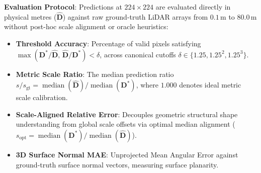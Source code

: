 \noindent\textbf{Evaluation Protocol}: Predictions at $224 \times 224$ are evaluated directly in physical metres ($\hat{\mathbf{D}}$) against raw ground-truth LiDAR arrays from $0.1$\,m to $80.0$\,m without post-hoc scale alignment or oracle heuristics:
\begin{itemize}
    \item \textbf{Threshold Accuracy}: Percentage of valid pixels satisfying $\max(\mathbf{D}^* / \hat{\mathbf{D}},\, \hat{\mathbf{D}} / \mathbf{D}^*) < \delta$, across canonical cutoffs $\delta \in \{1.25, 1.25^2, 1.25^3\}$.
    \item \textbf{Metric Scale Ratio}: The median prediction ratio $s / s_{\text{gt}} = \operatorname{median}(\hat{\mathbf{D}}) / \operatorname{median}(\mathbf{D}^*)$, where $1.000$ denotes ideal metric scale calibration.
    \item \textbf{Scale-Aligned Relative Error}: Decouples geometric structural shape understanding from global scale offsets via optimal median alignment ($s_{\text{opt}} = \operatorname{median}(\mathbf{D}^*) / \operatorname{median}(\hat{\mathbf{D}})$).
    \item \textbf{3D Surface Normal MAE}: Unprojected Mean Angular Error against ground-truth surface normal vectors, measuring surface planarity.
\end{itemize}

